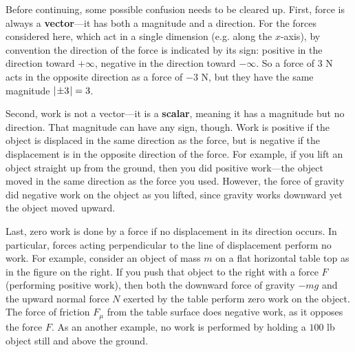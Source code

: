 \newpage
Before continuing, some possible confusion needs to be cleared up. First, force
is always a \textbf{vector}---it has both a magnitude and a direction. For the
forces considered here, which act in a single dimension (e.g. along the
$x$-axis), by convention the direction of the force is indicated by its sign:
positive in the direction toward $+\infty$, negative in the direction toward
$-\infty$. So a force of $3$ N acts in the opposite direction as a force of $-3$
N, but they have the same magnitude $\lvert\mspace{1mu}\pm 3\mspace{1mu}\rvert=3$.

Second, work is not a vector---it is a \textbf{scalar}, meaning it has a
magnitude but no direction. That magnitude can have any sign, though. Work is
positive if the object is displaced in the same direction as the force, but is
negative if the displacement is in the opposite direction of the force. For
example, if you lift an object straight up from the ground, then you did
positive work---the object moved in the same direction as the force you used.
However, the force of gravity did negative work on the object as you lifted,
since gravity works downward yet the object moved upward.

Last, zero work is done by a force if no displacement in its direction occurs.
In particular, forces acting perpendicular to the line of displacement perform
no work. For example, consider an object of mass $m$ on a flat horizontal table
top as in the figure on the right. If you push that object to the right with a
force $F$ (performing positive work), then both the downward force of gravity
$-mg$ and the upward normal force $N$ exerted by the table perform zero work on
the object. The force of friction $F_{\mu}$ from the table surface does negative
work, as it opposes the force $F$. As an another example, no work is performed
by holding a $100$ lb object still and above the ground.


